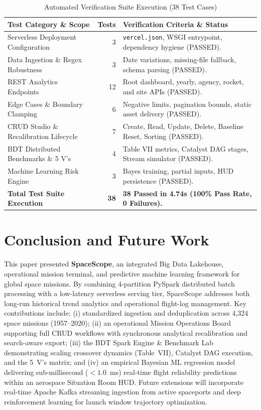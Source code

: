 \documentclass[10pt]{article}
\begin{document}
\begin{table}[htbp]
\centering
\caption{Automated Verification Suite Execution (38 Test Cases)}
\label{tab:test_results}
\scriptsize
\begin{tabularx}{\linewidth}{l r l}
\toprule
\textbf{Test Category \& Scope} & \textbf{Tests} & \textbf{Verification Criteria \& Status} \\
\midrule
Serverless Deployment Configuration & 3 & \texttt{vercel.json}, WSGI entrypoint, dependency hygiene (PASSED). \\
Data Ingestion \& Regex Robustness & 3 & Date variations, missing-file fallback, schema parsing (PASSED). \\
REST Analytics Endpoints & 12 & Root dashboard, yearly, agency, rocket, and site APIs (PASSED). \\
Edge Cases \& Boundary Clamping & 6 & Negative limits, pagination bounds, static asset delivery (PASSED). \\
CRUD Studio \& Recalibration Lifecycle & 7 & Create, Read, Update, Delete, Baseline Reset, Sorting (PASSED). \\
BDT Distributed Benchmarks \& 5 V's & 4 & Table VII metrics, Catalyst DAG stages, Stream simulator (PASSED). \\
Machine Learning Risk Engine & 3 & Bayes training, partial inputs, HUD persistence (PASSED). \\
\textbf{Total Test Suite Execution} & \textbf{38} & \textbf{38 Passed in 4.74s (100\% Pass Rate, 0 Failures).} \\
\bottomrule
\end{tabularx}
\end{table}

\section{Conclusion and Future Work}

This paper presented \textbf{SpaceScope}, an integrated Big Data Lakehouse, operational mission terminal, and predictive machine learning framework for global space missions. By combining 4-partition PySpark distributed batch processing with a low-latency serverless serving tier, SpaceScope addresses both long-run historical trend analytics and operational flight-log management. Key contributions include: (i) standardized ingestion and deduplication across 4,324 space missions (1957--2020); (ii) an operational Mission Operations Board supporting full CRUD workflows with synchronous analytical recalibration and search-aware export; (iii) the BDT Spark Engine \& Benchmark Lab demonstrating scaling crossover dynamics (Table~VII), Catalyst DAG execution, and the 5~V's matrix; and (iv) an empirical Bayesian ML regression model delivering sub-millisecond ($<1.0$~ms) real-time flight reliability predictions within an aerospace Situation Room HUD. Future extensions will incorporate real-time Apache Kafka streaming ingestion from active spaceports and deep reinforcement learning for launch window trajectory optimization.
\end{document}
